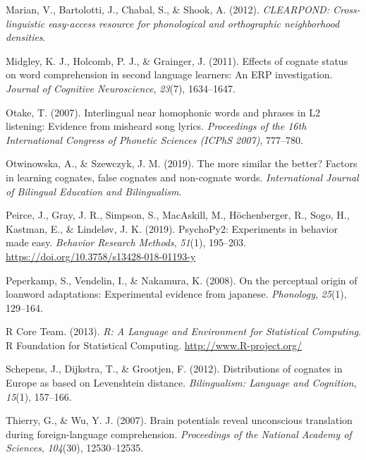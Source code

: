 \documentclass[
]{article}
\newlength{\cslhangindent}
\newenvironment{CSLReferences}[2] %
 {\begin{list}{}{%
  \setlength{\itemindent}{0pt}
  \setlength{\leftmargin}{0pt}
  \setlength{\parsep}{0pt}
  \ifodd #1
   \setlength{\leftmargin}{\cslhangindent}
   \setlength{\itemindent}{-1\cslhangindent}
  \fi
  \setlength{\itemsep}{#2\baselineskip}}}
 {\end{list}}
\begin{document}
\begin{CSLReferences}{1}{0}
Marian, V., Bartolotti, J., Chabal, S., \& Shook, A. (2012).
\emph{{CLEARPOND}: {Cross-linguistic} easy-access resource for
phonological and orthographic neighborhood densities}.

Midgley, K. J., Holcomb, P. J., \& Grainger, J. (2011). Effects of
cognate status on word comprehension in second language learners: {An
ERP} investigation. \emph{Journal of Cognitive Neuroscience},
\emph{23}(7), 1634--1647.

Otake, T. (2007). Interlingual near homophonic words and phrases in L2
listening: Evidence from misheard song lyrics. \emph{Proceedings of the
16th International Congress of Phonetic Sciences (ICPhS 2007)},
777--780.

Otwinowska, A., \& Szewczyk, J. M. (2019). The more similar the better?
Factors in learning cognates, false cognates and non-cognate words.
\emph{International Journal of Bilingual Education and Bilingualism}.

Peirce, J., Gray, J. R., Simpson, S., MacAskill, M., Höchenberger, R.,
Sogo, H., Kastman, E., \& Lindeløv, J. K. (2019). {PsychoPy2}:
{Experiments} in behavior made easy. \emph{Behavior Research Methods},
\emph{51}(1), 195--203. \url{https://doi.org/10.3758/s13428-018-01193-y}

Peperkamp, S., Vendelin, I., \& Nakamura, K. (2008). On the perceptual
origin of loanword adaptations: Experimental evidence from japanese.
\emph{Phonology}, \emph{25}(1), 129--164.

R Core Team. (2013). \emph{R: {A Language} and {Environment} for
{Statistical Computing}}. R Foundation for Statistical Computing.
\url{http://www.R-project.org/}

Schepens, J., Dijkstra, T., \& Grootjen, F. (2012). Distributions of
cognates in {Europe} as based on {Levenshtein} distance.
\emph{Bilingualism: Language and Cognition}, \emph{15}(1), 157--166.

Thierry, G., \& Wu, Y. J. (2007). Brain potentials reveal unconscious
translation during foreign-language comprehension. \emph{Proceedings of
the National Academy of Sciences}, \emph{104}(30), 12530--12535.


\end{CSLReferences}
\end{document}
